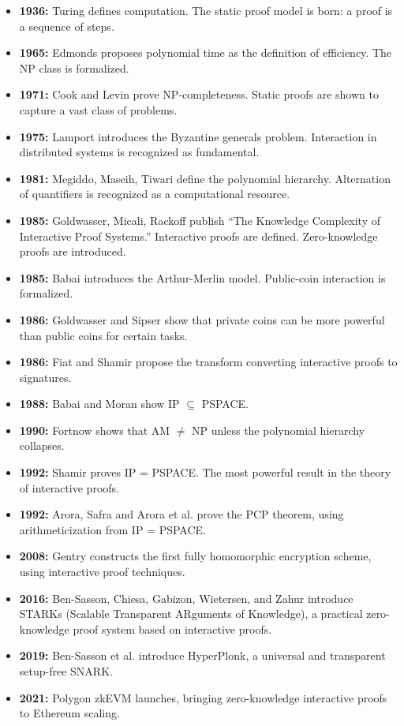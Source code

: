\begin{itemize}
\item \textbf{1936:} Turing defines computation. The static proof model is born: a proof is a sequence of steps.
\item \textbf{1965:} Edmonds proposes polynomial time as the definition of efficiency. The NP class is formalized.
\item \textbf{1971:} Cook and Levin prove NP-completeness. Static proofs are shown to capture a vast class of problems.
\item \textbf{1975:} Lamport introduces the Byzantine generals problem. Interaction in distributed systems is recognized as fundamental.
\item \textbf{1981:} Megiddo, Maseih, Tiwari define the polynomial hierarchy. Alternation of quantifiers is recognized as a computational resource.
\item \textbf{1985:} Goldwasser, Micali, Rackoff publish ``The Knowledge Complexity of Interactive Proof Systems.'' Interactive proofs are defined. Zero-knowledge proofs are introduced.
\item \textbf{1985:} Babai introduces the Arthur-Merlin model. Public-coin interaction is formalized.
\item \textbf{1986:} Goldwasser and Sipser show that private coins can be more powerful than public coins for certain tasks.
\item \textbf{1986:} Fiat and Shamir propose the transform converting interactive proofs to signatures.
\item \textbf{1988:} Babai and Moran show IP $\subseteq$ PSPACE.
\item \textbf{1990:} Fortnow shows that AM $\neq$ NP unless the polynomial hierarchy collapses.
\item \textbf{1992:} Shamir proves IP = PSPACE. The most powerful result in the theory of interactive proofs.
\item \textbf{1992:} Arora, Safra and Arora et al. prove the PCP theorem, using arithmeticization from IP = PSPACE.
\item \textbf{2008:} Gentry constructs the first fully homomorphic encryption scheme, using interactive proof techniques.
\item \textbf{2016:} Ben-Sasson, Chiesa, Gabizon, Wietersen, and Zahur introduce STARKs (Scalable Transparent ARguments of Knowledge), a practical zero-knowledge proof system based on interactive proofs.
\item \textbf{2019:} Ben-Sasson et al. introduce HyperPlonk, a universal and transparent setup-free SNARK.
\item \textbf{2021:} Polygon zkEVM launches, bringing zero-knowledge interactive proofs to Ethereum scaling.
\end{itemize}

